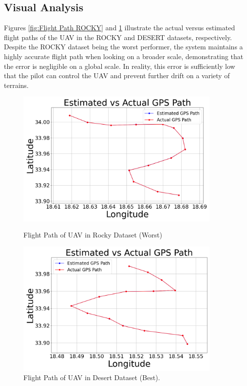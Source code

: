 \subsection{Visual Analysis}

Figures \ref{fig:Flight Path ROCKY} and \ref{fig:Flight Path DESERT} illustrate the actual versus estimated flight paths of the UAV in the ROCKY and DESERT datasets, respectively. Despite the ROCKY dataset being the worst performer, the system maintains a highly accurate flight path when looking on a broader scale, demonstrating that the error is negligible on a global scale. In reality, this error is sufficiently low that the pilot can control the UAV and prevent further drift on a variety of terrains.

\begin{figure}[H]
    \centering
    \begin{minipage}{0.45\textwidth}
        \centering
        \includegraphics[width=0.9\textwidth]{./Chapter 5/GPSpaths/PathCity1.png}
        \caption{Flight Path of UAV in Rocky Dataset (Worst)}
        \label{fig:Flight Path ROCKY}
    \end{minipage}\hfill
    \begin{minipage}{0.45\textwidth}
        \centering
        \includegraphics[width=0.9\textwidth]{./Chapter 5/GPSpaths/PathCity2.png}
        \caption{Flight Path of UAV in Desert Dataset (Best).}
        \label{fig:Flight Path DESERT}
    \end{minipage}
\end{figure}



